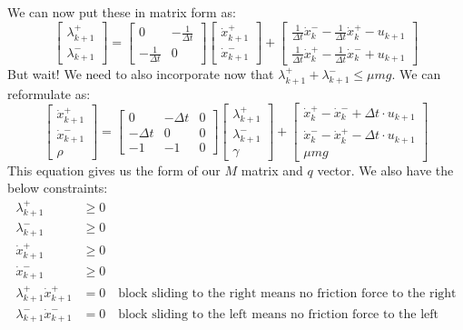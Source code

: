 \documentclass{article}
\begin{document}
We can now put these in matrix form as:
\[
    \begin{bmatrix}
        \lambda ^+_{k+1} \\
        \lambda ^-_{k+1}
    \end{bmatrix}
    =
    \begin{bmatrix}
        0 & -\frac{1}{\Delta t} \\
        -\frac{1}{\Delta t} & 0
    \end{bmatrix}
    \begin{bmatrix}
        \dot x ^+_{k+1} \\
        \dot x ^-_{k+1}
    \end{bmatrix}
    +
    \begin{bmatrix}
        \frac{1}{\Delta t} \dot x^-_k - \frac{1}{\Delta t} \dot x^+_k - u_{k+1} \\
        \frac{1}{\Delta t} \dot x^+_k - \frac{1}{\Delta t} \dot x^-_k + u_{k+1}
    \end{bmatrix}
\]
But wait! We need to also incorporate now that $\lambda ^+ _{k+1} + \lambda^- _{k+1} \leq \mu m g$. We can reformulate as:
\[
    \begin{bmatrix}
        \dot x ^+_{k+1} \\
        \dot x ^-_{k+1} \\
        \rho
    \end{bmatrix}
    =
    \begin{bmatrix}
        0 & -{\Delta t} & 0 \\
        -{\Delta t} & 0 & 0 \\
        -1 & -1 & 0
    \end{bmatrix}
    \begin{bmatrix}
        \lambda ^+_{k+1} \\
        \lambda ^-_{k+1} \\
        \gamma
    \end{bmatrix}
    +
    \begin{bmatrix}
        \dot x^+_k - \dot x^-_k + \Delta t \cdot u_{k+1} \\
        \dot x^-_k - \dot x^+_k - \Delta t \cdot u_{k+1} \\
        \mu m g
    \end{bmatrix}
\]
This equation gives us the form of our $M$ matrix and $q$ vector. We also have the below constraints:
\begin{align*}
    \lambda^+_{k+1} &\geq 0\\
    \lambda^-_{k+1} &\geq 0 \\
    \dot x^+_{k+1} &\geq 0 \\
    \dot x^-_{k+1} &\geq 0 \\
    \lambda^+_{k+1} \dot x^+_{k+1} &= 0 \quad \textrm{block sliding to the right means no friction force to the right} \\
    \lambda^-_{k+1} \dot x^-_{k+1} &= 0 \quad \textrm{block sliding to the left means no friction force to the left}
\end{align*}
\end{document}
